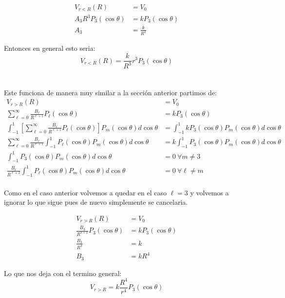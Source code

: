 \documentclass{report}
\begin{document}
\begin{align*}
	V_{r < R}(R) &= V_0\\
	A_3 R^3 P_3(\cos\theta) &= k P_3(\cos\theta)\\
	A_3 &= \frac{k}{R^3} 
\end{align*}

Entonces en general esto seria:
\[
	V_{r < R}(R) = \frac{k}{R^3} r^3 P_3(\cos\theta)
\]

\section{}

Este funciona de manera muy similar a la sección anterior partimos de:
\begin{align*}
	V_{r > R}(R) &= V_0\\
	\sum_{\ell = 0}^{\infty} \frac{B_\ell}{R^{\ell + 1}} P_\ell(\cos\theta) &= k P_3(\cos\theta)\\
	\int_{-1}^{1}\left[\sum_{\ell = 0}^{\infty} \frac{B_\ell}{R^{\ell + 1}} P_\ell(\cos\theta)\right]P_m(\cos\theta)d\cos\theta &= \int_{-1}^{1} k P_3(\cos\theta)P_m(\cos\theta) d\cos\theta\\
	\sum_{\ell = 0}^{\infty} \frac{B_\ell}{R^{\ell + 1}} \int_{-1}^{1} P_\ell(\cos\theta)P_m(\cos\theta)d\cos\theta &= k \int_{-1}^{1} P_3(\cos\theta)P_m(\cos\theta)d\cos\theta\\
	\int_{-1}^1 P_3(\cos\theta) P_m(\cos\theta) d\cos\theta &= 0\ \forall m \neq 3\\
	\frac{B_\ell}{R^{\ell + 2}} \int_{-1}^{1} P_\ell(\cos\theta)P_m(\cos\theta)d\cos\theta &= 0\ \forall \ell \neq m \\
\end{align*}

Como en el caso anterior volvemos a quedar en el caso $\ell = 3$ y volvemos a ignorar lo que sigue pues de nuevo simplemente se cancelaria.

\begin{align*}
	V_{r > R}(R) &= V_0\\
	\frac{B_3}{R^{3 + 1}} P_3(\cos\theta) &= k P_3(\cos\theta)\\
	\frac{B_3}{R^{4}} &= k \\
	B_3 &= k R^4
\end{align*}

Lo que nos deja con el termino general:
\[
	V_{r > R} = k \frac{R^4}{r^4} P_3(\cos\theta)
\]

\section{}
\end{document}
